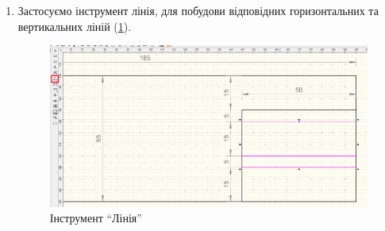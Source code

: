 \begin{enumerate}[leftmargin=*]
  \FloatBarrier

\item Застосуємо інструмент лінія, для побудови відповідних горизонтальних та вертикальних ліній
  (\ref{fig:lab2:line}).
  \begin{figure}[!htb]
    \centering \includegraphics[width=0.7\linewidth]{./images/lab2/fourth_step.png}
    \caption{Інструмент ``Лінія''}
    \label{fig:lab2:line}
  \end{figure}
  \FloatBarrier


\end{enumerate}
